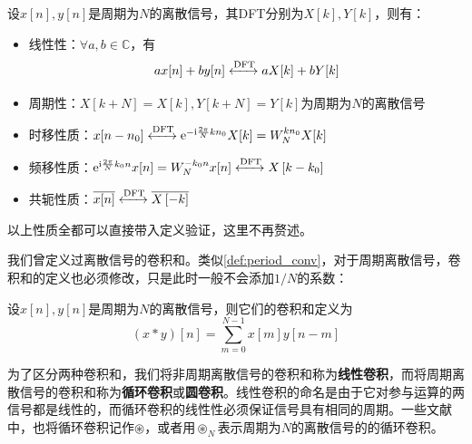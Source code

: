 \begin{proposition}[离散傅里叶变换的运算性质]
    \label{prop:DFT_operation}
    设$x[n],y[n]$是周期为$N$的离散信号，其DFT分别为$X[k],Y[k]$，则有：\begin{itemize}
        \item 线性性：$\forall a,b\in\mathbb{C}$，有
    \[a x[n]+b y[n]\xleftrightarrow{\mathrm{DFT}} a X[k]+b Y[k]\]
        \item 周期性：$X[k+N]=X[k],Y[k+N]=Y[k]$为周期为$N$的离散信号
        \item 时移性质：$x[n-n_0]\xleftrightarrow{\mathrm{DFT}}\mathrm{e}^{-\mathrm{i}\frac{2\pi}{N}kn_0}X[k]=W_N^{kn_0}X[k]$
        \item 频移性质：$\mathrm{e}^{\mathrm{i}\frac{2\pi}{N}k_0 n}x[n]=W_N^{-k_0 n}x[n]\xleftrightarrow{\mathrm{DFT}}X\left[k-k_0\right]$
        \item 共轭性质：$\overline{x[n]}\xleftrightarrow{\mathrm{DFT}}\overline{X\left[-k\right]}$
    \end{itemize}
\end{proposition}

以上性质全都可以直接带入定义验证，这里不再赘述。

我们曾定义过离散信号的卷积和。类似\cref{def:period_conv}，对于周期离散信号，卷积和的定义也必须修改，只是此时一般不会添加$1/N$的系数：
\begin{definition}[周期离散信号的卷积和]
    设$x[n],y[n]$是周期为$N$的离散信号，则它们的卷积和定义为
    \[(x*y)[n]=\sum_{m=0}^{N-1}x[m]y[n-m]\]
\end{definition}
为了区分两种卷积和，我们将非周期离散信号的卷积和称为\textbf{线性卷积}，而将周期离散信号的卷积和称为\textbf{循环卷积}或\textbf{圆卷积}。线性卷积的命名是由于它对参与运算的两信号都是线性的，而循环卷积的线性性必须保证信号具有相同的周期。一些文献中，也将循环卷积记作$\circledast$，或者用$\circledast_N$表示周期为$N$的离散信号的的循环卷积。

